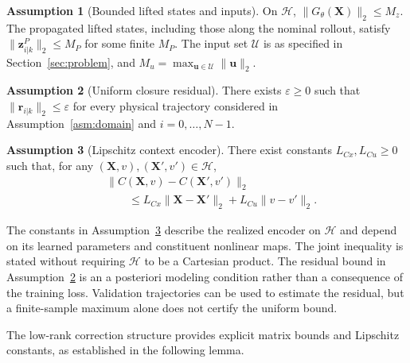 \documentclass[journal]{IEEEtran}
\newcommand{\vr}{\mathbf{r}}
\newcommand{\vu}{\mathbf{u}}
\newcommand{\vz}{\mathbf{z}}
\newcommand{\mX}{\mathbf{X}}
\newcommand{\norm}[2][]{\mathopen{#1\lVert}#2\mathclose{#1\rVert}}
\theoremstyle{plain}
\theoremstyle{definition}
\newtheorem{assumption}{Assumption}
\theoremstyle{definition}
\begin{document}
\begin{assumption}[Bounded lifted states and inputs]
\label{asm:bounds}
On $\mathcal H$, $\norm{G_\theta(\mX)}_2\le M_z$. The propagated
lifted states, including those along the nominal rollout, satisfy
$\norm{\vz_{i|k}^P}_2\le M_P$ for some finite $M_P$. The input set $\mathcal U$ is as
specified in Section~\ref{sec:problem}, and
$M_u=\max_{\vu\in\mathcal U}\norm{\vu}_2$.
\end{assumption}

\begin{assumption}[Uniform closure residual]
\label{asm:residual}
There exists $\varepsilon\ge0$ such that
$\norm{\vr_{i|k}}_2\le\varepsilon$ for every physical trajectory
considered in Assumption~\ref{asm:domain} and $i=0,\ldots,N-1$.
\end{assumption}

\begin{assumption}[Lipschitz context encoder]
\label{asm:context_lipschitz}
There exist constants $L_{Cx},L_{Cu}\ge0$ such that, for any
$(\mX,v),(\mX',v')\in\mathcal H$,
\begin{equation}
\begin{aligned}
&\norm{C(\mX,v)-C(\mX',v')}_2\\
&\qquad\le L_{Cx}\norm{\mX-\mX'}_2+L_{Cu}\norm{v-v'}_2.
\end{aligned}
\label{eq:context_lipschitz}
\end{equation}
\end{assumption}

The constants in Assumption~\ref{asm:context_lipschitz} describe the
realized encoder on $\mathcal H$ and depend on its learned parameters
and constituent nonlinear maps. The joint inequality is stated
without requiring $\mathcal H$ to be a Cartesian product. The residual
bound in Assumption~\ref{asm:residual} is an a posteriori modeling
condition rather than a consequence of the training loss. Validation
trajectories can be used to estimate the residual, but a finite-sample
maximum alone does not certify the uniform bound.

The low-rank correction structure provides explicit matrix bounds
and Lipschitz constants, as established in the following lemma.
\end{document}
